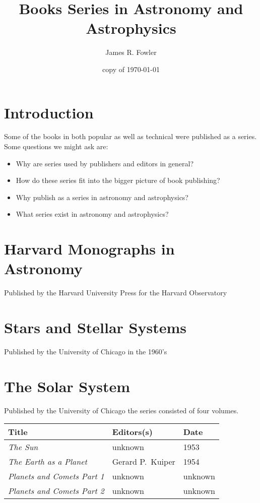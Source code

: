 \documentclass{article}
\begin{document}
\title{Books Series in Astronomy and Astrophysics}
\author{James R. Fowler}
\date{copy of \today}

\maketitle

\tableofcontents
\listoftables

\section{Introduction}

Some of the books in  both popular as well as technical were published
as a series.  Some questions we might ask are:

\begin{itemize}
  \item Why are series used by publishers and editors in general?
  \item How do these series fit into the bigger picture of book publishing?
  \item Why publish as a series in astronomy and astrophysics?
  \item What series exist in astronomy and astrophysics?
\end{itemize}

    
    


\section{Harvard Monographs in Astronomy}

Published by the Harvard University Press for the Harvard Observatory

\section{Stars and Stellar Systems}

Published by the University of Chicago in the 1960's

\section{The Solar System}

Published by the University of Chicago the series consisted of four volumes.

\begin{tabular}{l l l}
  Title & Editors(s) & Date \\  \hline
  {\it The Sun} & unknown & 1953 \\
  {\it The Earth as a Planet} & Gerard P.\ Kuiper & 1954 \\
  {\it Planets and Comets Part 1} & unknown & unknown \\
  {\it Planets and Comets Part 2} & unknown & unknown \\  \hline
\end{tabular}
\end{document}
